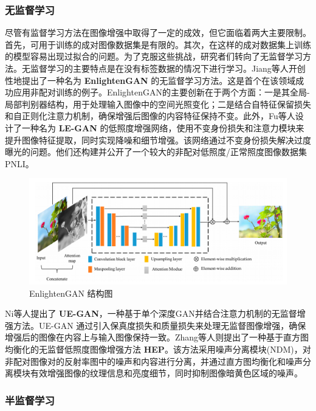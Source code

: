 \documentclass[a4paper, 10pt]{article}
\begin{document}
	\subsubsection{无监督学习}
	
	尽管有监督学习方法在图像增强中取得了一定的成效，但它面临着两大主要限制。首先，可用于训练的成对图像数据集是有限的。其次，在这样的成对数据集上训练的模型容易出现过拟合的问题。为了克服这些挑战，研究者们转向了无监督学习方法。无监督学习的主要特点是在没有标签数据的情况下进行学习。Jiang等人\cite{jiang2021enlightengan}开创性地提出了一种名为 \textbf{EnlightenGAN} 的无监督学习方法。这是首个在该领域成功应用非配对训练的例子。EnlightenGAN的主要创新在于两个方面：一是其全局-局部判别器结构，用于处理输入图像中的空间光照变化；二是结合自特征保留损失和自正则化注意力机制，确保增强后图像的内容特征保持不变。此外，Fu等人\cite{fu2022gan}设计了一种名为 \textbf{LE-GAN} 的低照度增强网络，使用不变身份损失和注意力模块来提升图像特征提取，同时实现降噪和细节增强。该网络通过不变身份损失解决过度曝光的问题。他们还构建并公开了一个较大的非配对低照度/正常照度图像数据集PNLI。
	
	\begin{figure}[htb]
		\centering 
		\includegraphics[width=0.7\columnwidth]{picture/LLIE/EnlightenGAN/EnlightenGAN}
		\caption{
			\label{fig: EnlightenGAN} 
			EnlightenGAN 结构图
		}
	\end{figure}
	
	Ni等人\cite{ni2020towards}提出了 \textbf{UE-GAN}，一种基于单个深度GAN并结合注意力机制的无监督增强方法。UE-GAN 通过引入保真度损失和质量损失来处理无监督图像增强，确保增强后的图像在内容上与输入图像保持一致。Zhang等人\cite{zhang2021unsupervised}则提出了一种基于直方图均衡化的无监督低照度图像增强方法 \textbf{HEP}。该方法采用噪声分离模块(NDM)，对非配对图像对的反射率图中的噪声和内容进行分离，并通过直方图均衡化和噪声分离模块有效增强图像的纹理信息和亮度细节，同时抑制图像暗黄色区域的噪声。
	
	\subsubsection{半监督学习}
	
\end{document}
